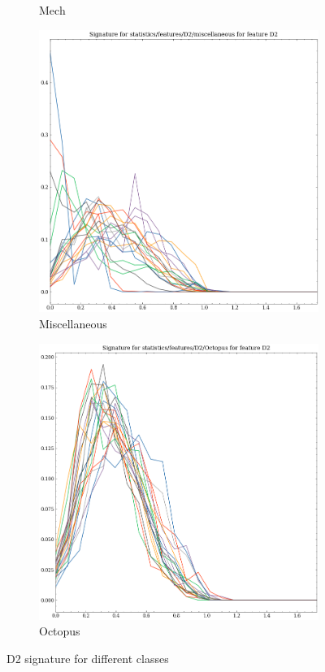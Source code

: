 \begin{figure}[t!p]
\begin{subfigure}[b]{0.23\textwidth}
        \caption{Mech}
    \end{subfigure}
    \hfill
    \begin{subfigure}[b]{0.23\textwidth}
        \includegraphics[width=\textwidth]{assets/feature_extraction/D2/miscellaneous.png}
        \caption{Miscellaneous}
    \end{subfigure}
    \hfill
    \begin{subfigure}[b]{0.23\textwidth}
        \includegraphics[width=\textwidth]{assets/feature_extraction/D2/Octopus.png}
        \caption{Octopus}
    \end{subfigure}
    \hfill
    \caption{D2 signature for different classes}
    \label{fig:D2-signatures-1}
\end{figure}

